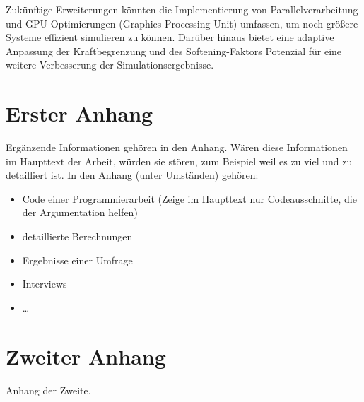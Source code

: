 \documentclass[a4paper,12pt,twoside]{article}
\begin{document}
Zukünftige Erweiterungen könnten die Implementierung von Parallelverarbeitung und GPU-Optimierungen (Graphics Processing Unit) umfassen, um noch größere Systeme effizient simulieren zu können. Darüber hinaus bietet eine adaptive Anpassung der Kraftbegrenzung und des Softening-Faktors Potenzial für eine weitere Verbesserung der Simulationsergebnisse.


\section{Erster Anhang}

Ergänzende Informationen gehören in den Anhang. Wären diese Informationen im Haupttext der Arbeit, würden sie stören, zum Beispiel weil es zu viel und zu detailliert ist. In den Anhang (unter Umständen) gehören:
\begin{itemize}
	\item Code einer Programmierarbeit (Zeige im Haupttext nur Codeausschnitte, die der Argumentation helfen)
	\item detaillierte Berechnungen
	\item Ergebnisse einer Umfrage
	\item Interviews
	\item \ldots
\end{itemize}


\newpage

\section{Zweiter Anhang}

Anhang der Zweite.





\newpage

\clearpage



\newpage
{} %
\listoffigures %
\end{document}
